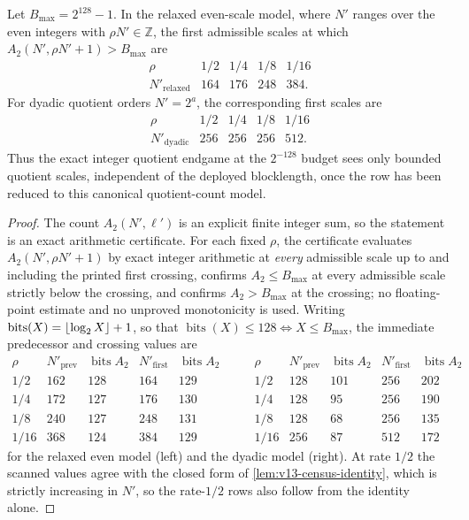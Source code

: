 \begin{theorem}\label{thm:v13-census}
Let $B_{\max}=2^{128}-1$.  In the relaxed even-scale model, where $N'$ ranges over the even integers with $\rho N'\in\mathbb Z$, the first admissible scales at which $A_2(N',\rho N'+1)>B_{\max}$ are
\[
\begin{array}{c|cccc}
\rho & 1/2 & 1/4 & 1/8 & 1/16\\ \hline
N'_{\mathrm{relaxed}} & 164 & 176 & 248 & 384 .
\end{array}
\]
For dyadic quotient orders $N'=2^a$, the corresponding first scales are
\[
\begin{array}{c|cccc}
\rho & 1/2 & 1/4 & 1/8 & 1/16\\ \hline
N'_{\mathrm{dyadic}} & 256 & 256 & 256 & 512 .
\end{array}
\]
Thus the exact integer quotient endgame at the $2^{-128}$ budget sees only bounded quotient scales, independent of the deployed blocklength, once the row has been reduced to this canonical quotient-count model.
\end{theorem}

\begin{proof}
The count $A_2(N',\ell')$ is an explicit finite integer sum, so the statement is an exact arithmetic certificate.  For each fixed $\rho$, the certificate evaluates $A_2(N',\rho N'+1)$ by exact integer arithmetic at \emph{every} admissible scale up to and including the printed first crossing, confirms $A_2\le B_{\max}$ at every admissible scale strictly below the crossing, and confirms $A_2>B_{\max}$ at the crossing; no floating-point estimate and no unproved monotonicity is used.  Writing $\operatorname{bits}(X)=\left\lfloor \log_2X\right\rfloor+1$, so that $\operatorname{bits}(X)\le128\iff X\le B_{\max}$, the immediate predecessor and crossing values are
\[
\begin{array}{c|cc|cc}
\rho & N'_{\mathrm{prev}} & \operatorname{bits} A_2 & N'_{\mathrm{first}} & \operatorname{bits} A_2\\ \hline
1/2  & 162 & 128 & 164 & 129\\
1/4  & 172 & 127 & 176 & 130\\
1/8  & 240 & 127 & 248 & 131\\
1/16 & 368 & 124 & 384 & 129
\end{array}
\qquad
\begin{array}{c|cc|cc}
\rho & N'_{\mathrm{prev}} & \operatorname{bits} A_2 & N'_{\mathrm{first}} & \operatorname{bits} A_2\\ \hline
1/2  & 128 & 101 & 256 & 202\\
1/4  & 128 &  95 & 256 & 190\\
1/8  & 128 &  68 & 256 & 135\\
1/16 & 256 &  87 & 512 & 172
\end{array}
\]
for the relaxed even model \textup(left\textup) and the dyadic model \textup(right\textup).  At rate $1/2$ the scanned values agree with the closed form of \cref{lem:v13-census-identity}, which is strictly increasing in $N'$, so the rate-$1/2$ rows also follow from the identity alone.
\end{proof}

